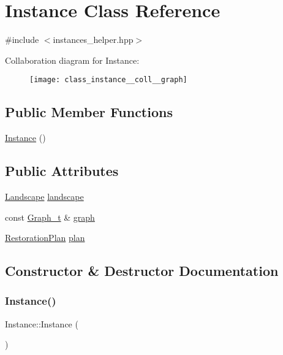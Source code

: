 \hypertarget{class_instance}{}\section{Instance Class Reference}
\label{class_instance}


{\ttfamily \#include $<$instances\+\_\+helper.\+hpp$>$}



Collaboration diagram for Instance\+:\nopagebreak
\begin{figure}[H]
\begin{center}
\leavevmode
\texttt{[image: class\_instance\_\_coll\_\_graph]}
\end{center}
\end{figure}
\subsection*{Public Member Functions}
\begin{DoxyCompactItemize}
\item 
\hyperlink{class_instance_a399506c7e75ab9ab78fbc34a25932bbd}{Instance} ()
\end{DoxyCompactItemize}
\subsection*{Public Attributes}
\begin{DoxyCompactItemize}
\item 
\hyperlink{class_landscape}{Landscape} \hyperlink{class_instance_a5a255c00cd67699f9aed6a3402f94560}{landscape}
\item 
const \hyperlink{pl__reff_8cpp_a65aea14f39d53b24df9910d54216d620}{Graph\+\_\+t} \& \hyperlink{class_instance_a7b76d85eaacaec2480ceed2218108013}{graph}
\item 
\hyperlink{class_restoration_plan}{Restoration\+Plan} \hyperlink{class_instance_a95435f6fe84c71114f4e47160854d621}{plan}
\end{DoxyCompactItemize}


\subsection{Constructor \& Destructor Documentation}
\mbox{\label{class_instance_a399506c7e75ab9ab78fbc34a25932bbd}} 
\subsubsection{\texorpdfstring{Instance()}{Instance()}}
{\footnotesize\ttfamily Instance\+::\+Instance (\begin{DoxyParamCaption}{ }\end{DoxyParamCaption})\hspace{0.3cm}{\ttfamily [inline]}}



